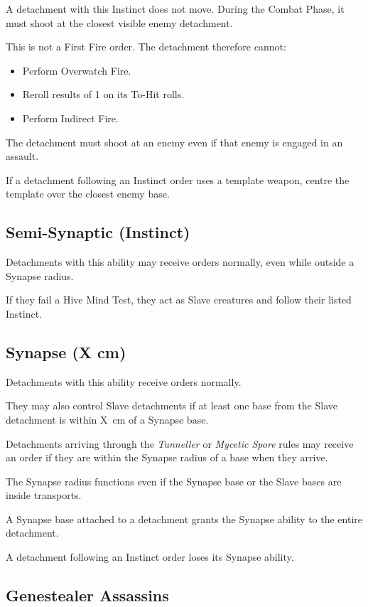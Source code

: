 A detachment with this Instinct does not move. During the Combat Phase, it must shoot at the closest visible enemy detachment.

This is not a First Fire order. The detachment therefore cannot:

\begin{itemize}
    \item Perform Overwatch Fire.
    \item Reroll results of 1 on its To-Hit rolls.
    \item Perform Indirect Fire.
\end{itemize}

The detachment must shoot at an enemy even if that enemy is engaged in an assault.

If a detachment following an Instinct order uses a template weapon, centre the template over the closest enemy base.

\subsection{Semi-Synaptic (Instinct)}

Detachments with this ability may receive orders normally, even while outside a Synapse radius.

If they fail a Hive Mind Test, they act as Slave creatures and follow their listed Instinct.

\subsection{Synapse (X cm)}

Detachments with this ability receive orders normally.

They may also control Slave detachments if at least one base from the Slave detachment is within X~cm of a Synapse base.

Detachments arriving through the \textit{Tunneller} or \textit{Mycetic Spore} rules may receive an order if they are within the Synapse radius of a base when they arrive.

The Synapse radius functions even if the Synapse base or the Slave bases are inside transports.

A Synapse base attached to a detachment grants the Synapse ability to the entire detachment.

A detachment following an Instinct order loses its Synapse ability.

\subsection{Genestealer Assassins}

